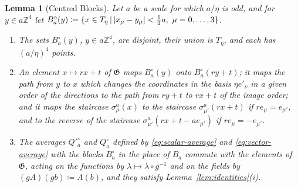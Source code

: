 \documentclass[11pt]{preprint}
\DeclarePairedDelimiter{\abs}{\lvert}{\rvert}
\numberwithin{equation}{section}
\newtheorem{lemma}[theorem]{Lemma}
\theoremstyle{definition}
\theoremstyle{remark}
\theoremstyle{plain}
\begin{document}
\begin{lemma}[Centred Blocks]\label{lem:centred-blocks}
Let $a$ be a scale for which $a/\eta$ is odd, and for $y \in a\mathbb Z^4$ let $B^\circ_a(y) \coloneqq \{ x \in T_\eta \, | \, \abs{x_\mu - y_\mu} < \frac12a,\ \mu = 0, \dots, 3 \}$.
\begin{enumerate}[label=(\roman*)]
\item The sets $B^\circ_a(y)$, $y \in a\mathbb Z^4$, are disjoint, their union is $T_\eta$, and each has $(a/\eta)^4$ points.
\item An element $x \mapsto rx + t$ of $\mathfrak G$ maps $B^\circ_a(y)$ onto $B^\circ_a(ry + t)$; it maps the path from $y$ to $x$ which changes the coordinates in the basis $\eta e'_\nu$ in a given order of the directions to the path from $ry + t$ to $rx + t$ of the image order; and it maps the staircase $\sigma^a_\mu(x)$ to the staircase $\sigma^a_{\mu'}(rx + t)$ if $re_\mu = e_{\mu'}$, and to the reverse of the staircase $\sigma^a_{\mu'}(rx + t - ae_{\mu'})$ if $re_\mu = -e_{\mu'}$.
\item The averages $Q'^\circ_a$ and $Q^\circ_a$ defined by \eqref{eq:scalar-average} and \eqref{eq:vector-average} with the blocks $B^\circ_a$ in the place of $B_a$ commute with the elements of $\mathfrak G$, acting on the functions by $\lambda \mapsto \lambda \circ g^{-1}$ and on the fields by $(gA)(gb) \coloneqq A(b)$, and they satisfy Lemma~\ref{lem:identities}(i).
\end{enumerate}
\end{lemma}
\end{document}
